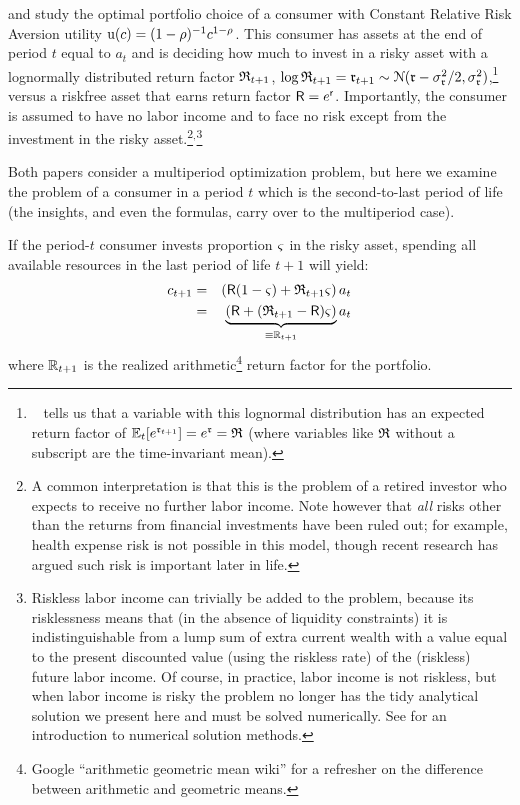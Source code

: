 
  \cite{merton:restat} and \cite{samuelson:portfolio} study the
  optimal portfolio choice of a consumer with Constant Relative Risk
  Aversion utility ${\mathrm{u}}(c) = (1-\rho)^{-1}c^{1-\rho}$.  This
  consumer has assets at the end of period $t$ equal to $a_{t}$ and is
  deciding how much to invest in a risky asset with a lognormally
  distributed return factor $\mathfrak{R}_{t+1}$, $\log \mathfrak{R}_{t+1} =
  \mathfrak{r}_{t+1} \sim
  \mathcal{N}(\mathfrak{r}-\sigma_{\mathfrak{r}}^{2}/2,\sigma^{2}_{\mathfrak{r}})$,\footnote{\MathFacts~
    tells us that a variable with this lognormal distribution has an
    expected return factor of
    $\mathbb{E}_{t}[e^{\mathfrak{r}_{t+1}}]=e^{\mathfrak{r}}=\mathfrak{R}$ (where variables
    like $\mathfrak{R}$ without a subscript are the time-invariant mean).}
  versus a riskfree asset that earns return factor
  $\mathsf{R}=e^{\mathsf{r}}$.  Importantly, the consumer is assumed to have
  no labor income and to face no risk except from the investment in
  the risky asset.\footnote{A common interpretation is that this is
    the problem of a retired investor who expects to receive no
    further labor income.  Note however that {\it all} risks other
    than the returns from financial investments have been ruled out;
    for example, health expense risk is not possible in this model,
    though recent research has argued such risk is important later in
    life.}$^{,}$\footnote{Riskless labor income can trivially be added
    to the problem, because its risklessness means that (in the
    absence of liquidity constraints) it is indistinguishable from a
    lump sum of extra current wealth with a value equal to the present
    discounted value (using the riskless rate) of the (riskless)
    future labor income.  Of course, in practice, labor income is not
    riskless, but when labor income is risky the problem no longer has
    the tidy analytical solution we present here and must be solved
    numerically.  See \cite{SolvingMicroDSOPs} for an introduction to
    numerical solution methods.}

Both papers consider a multiperiod optimization problem, but here we
examine the problem of a consumer in a period $t$ which is the
second-to-last period of life (the insights, and even the formulas,
carry over to the multiperiod case).

If the period-$t$ consumer invests proportion ${\varsigma}$ in the risky asset,
spending all available resources in the last period of life $t+1$ will yield:
\begin{eqnarray}
        c_{t+1} & = & \left(\mathsf{R}(1-{\varsigma})+\mathfrak{R}_{t+1}{\varsigma}\right)a_{t} \notag
\\ & = & \underbrace{\left(\mathsf{R}+(\mathfrak{R}_{t+1}-\mathsf{R}){\varsigma}\right)}_{\equiv \mathbb{R}_{t+1}}a_{t} \label{eq:RportDef}
\end{eqnarray}
where $\mathbb{R}_{t+1}$ is the realized arithmetic\footnote{Google ``arithmetic geometric mean wiki'' for a refresher on the difference between arithmetic and geometric means.} return factor for the portfolio.

